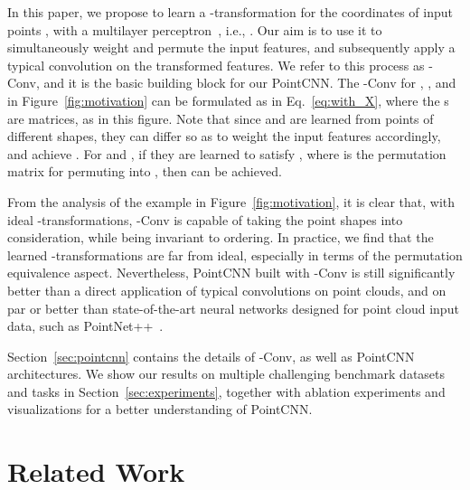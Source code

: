 \documentclass{article}
\begin{document}
In this paper, we propose to learn a  -transformation for the coordinates of  input points , with a multilayer perceptron~\cite{Rumelhart_1986}, i.e., . Our aim is to use it to simultaneously weight and permute the input features, and subsequently apply a typical convolution on the transformed features. We refer to this process as -Conv, and it is the basic building block for our PointCNN. The -Conv for , , and  in Figure~\ref{fig:motivation} can be formulated as in Eq.~\ref{eq:with_X}, where the s are  matrices, as  in this figure. Note that since  and  are learned from points of different shapes, they can differ so as to weight the input features accordingly, and achieve . For  and , if they are learned to satisfy , where  is the permutation matrix for permuting  into , then  can be achieved.

From the analysis of the example in Figure~\ref{fig:motivation}, it is clear that, with ideal -transformations, -Conv is capable of taking the point shapes into consideration, while being invariant to ordering. In practice, we find that the learned -transformations are far from ideal, especially in terms of the permutation equivalence aspect. Nevertheless, PointCNN built with -Conv is still significantly better than a direct application of typical convolutions on point clouds, and on par or better than state-of-the-art neural networks designed for point cloud input data, such as PointNet++~\cite{Qi_NIPS17}.

Section~\ref{sec:pointcnn} contains the details of -Conv, as well as PointCNN architectures. We show our results on multiple challenging benchmark datasets and tasks in Section~\ref{sec:experiments}, together with ablation experiments and visualizations for a better understanding of PointCNN.


 \section{Related Work}
\label{sec:related_work}
\end{document}

